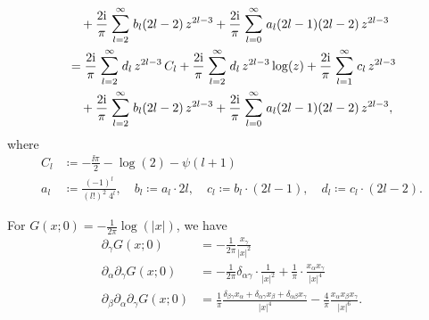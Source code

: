 \begin{align*}
 &\quad  + \frac{2 \ii}{\pi} \; \mathlarger{\sum}_{l = 2}^\infty \; b_l (2l - 2) \, z^{2l - 3} + \frac{2 \ii}{\pi}\; \mathlarger{\sum}_{l = 0}^\infty \; a_l (2l - 1) (2l - 2) \, z^{2l - 3} \\
  &= \frac{2 \ii}{\pi} \; \mathlarger{\sum}_{l = 2}^\infty \; d_l \, z^{2l - 3} \, C_l + \frac{2 \ii}{\pi} \; \mathlarger{\sum}_{l = 2}^\infty \; d_l \, z^{2l - 3} \log(z) + \frac{2 \ii}{\pi} \; \mathlarger{\sum}_{l = 1}^\infty \; c_l \, z^{2l - 3} \\
 &\quad  + \frac{2 \ii}{\pi} \; \mathlarger{\sum}_{l = 2}^\infty \; b_l (2l - 2) \, z^{2l - 3} + \frac{2 \ii}{\pi}\; \mathlarger{\sum}_{l = 0}^\infty \; a_l (2l - 1) (2l - 2) \, z^{2l - 3} ,
\end{align*}
where
\begin{align*}
  C_l &\coloneqq -\frac{\ii \pi}{2} - \log(2) - \psi(l + 1) \\
  a_l &\coloneqq \frac{(-1)^l}{(l!)^2 \; 4^l}, \quad
  b_l \coloneqq a_l \cdot  2l, \quad
  c_l \coloneqq b_l \cdot (2l - 1), \quad
  d_l \coloneqq c_l \cdot (2l - 2).
\end{align*}

For $G(x; 0) = -\frac{1}{2\pi} \log(|x|)$, we have
\begin{align*}
  \partial_\gamma G(x; 0) &= -\frac{1}{2\pi} \frac{x_\gamma}{|x|^2} \\
  \partial_\alpha \partial_\gamma G(x; 0) &= -\frac{1}{2\pi} \delta_{\alpha\gamma} \cdot \frac{1}{|x|^2} + \frac{1}{\pi} \cdot \frac{x_\alpha x_\gamma}{|x|^4} \\
  \partial_\beta \partial_\alpha \partial_\gamma G(x; 0)
  &= \frac{1}{\pi} \frac{\delta_{\beta \gamma} x_\alpha + \delta_{\alpha \gamma} x_\beta + \delta_{\alpha\beta} x_\gamma}{|x|^4} - \frac{4}{\pi} \frac{x_\alpha x_\beta x_\gamma}{|x|^6}.
\end{align*}

